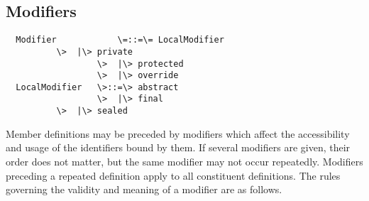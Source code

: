 \documentclass[11pt]{report}
\newcommand{\ifqualified}[1]{}
\begin{document}
\subsection{Modifiers}
\label{sec:modifiers}

\syntax\begin{verbatim}
  Modifier            \=::=\= LocalModifier
		  \>  |\> private
                  \>  |\> protected
                  \>  |\> override 
  LocalModifier   \>::=\> abstract
                  \>  |\> final
		  \>  |\> sealed
\end{verbatim}

Member definitions may be preceded by modifiers which affect the
\ifqualified{qualified names, }accessibility and usage of the
identifiers bound by them.  If several modifiers are given, their
order does not matter, but the same modifier may not occur repeatedly.
Modifiers preceding a repeated definition apply to all constituent
definitions.  The rules governing the validity and meaning of a
modifier are as follows.
\end{document}
